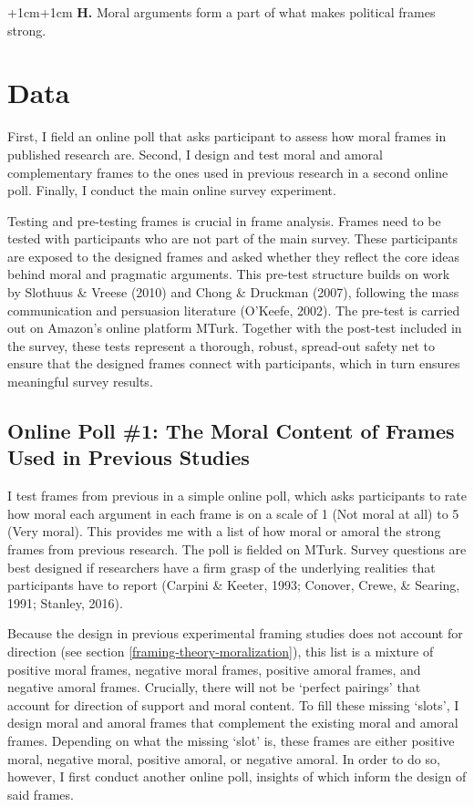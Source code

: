 \documentclass[12pt,econ]{sources/authesis}
\begin{document}
\vspace{0.3cm}
\begin{adjustwidth*}{+1cm}{+1cm}
\textbf{H.} Moral arguments form a part of what makes political frames strong.
\end{adjustwidth*}
\hypertarget{framing-data}{%
\section{Data}\label{framing-data}}

First, I field an online poll that asks participant to assess how moral frames in published research are. Second, I design and test moral and amoral complementary frames to the ones used in previous research in a second online poll. Finally, I conduct the main online survey experiment.

Testing and pre-testing frames is crucial in frame analysis. Frames need to be tested with participants who are not part of the main survey. These participants are exposed to the designed frames and asked whether they reflect the core ideas behind moral and pragmatic arguments. This pre-test structure builds on work by Slothuus \& Vreese (2010) and Chong \& Druckman (2007), following the mass communication and persuasion literature (O'Keefe, 2002). The pre-test is carried out on Amazon's online platform MTurk. Together with the post-test included in the survey, these tests represent a thorough, robust, spread-out safety net to ensure that the designed frames connect with participants, which in turn ensures meaningful survey results.

\hypertarget{framing-data-pollprevious}{%
\subsection{Online Poll \#1: The Moral Content of Frames Used in Previous Studies}\label{framing-data-pollprevious}}

I test frames from previous in a simple online poll, which asks participants to rate how moral each argument in each frame is on a scale of 1 (Not moral at all) to 5 (Very moral). This provides me with a list of how moral or amoral the strong frames from previous research. The poll is fielded on MTurk. Survey questions are best designed if researchers have a firm grasp of the underlying realities that participants have to report (Carpini \& Keeter, 1993; Conover, Crewe, \& Searing, 1991; Stanley, 2016).

Because the design in previous experimental framing studies does not account for direction (see section \ref{framing-theory-moralization}), this list is a mixture of positive moral frames, negative moral frames, positive amoral frames, and negative amoral frames. Crucially, there will not be `perfect pairings' that account for direction of support and moral content. To fill these missing `slots', I design moral and amoral frames that complement the existing moral and amoral frames. Depending on what the missing `slot' is, these frames are either positive moral, negative moral, positive amoral, or negative amoral. In order to do so, however, I first conduct another online poll, insights of which inform the design of said frames.
\end{document}

